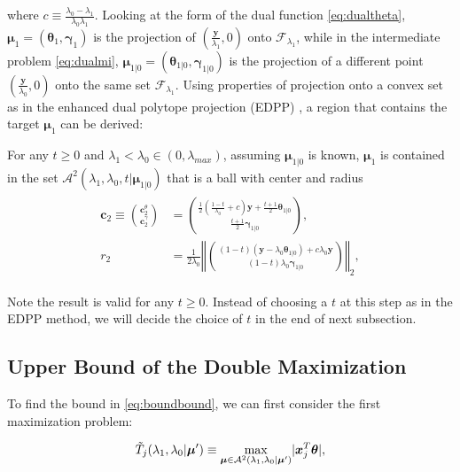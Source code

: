 where $c\equiv\frac{\lambda_0-\lambda_1}{\lambda_0\lambda_1}$. Looking at the form of the dual function \eqref{eq:dualtheta}, $\boldsymbol\mu_1=(\boldsymbol\theta_1,\boldsymbol\gamma_1)$ is the projection of $(\frac{\boldsymbol y}{\lambda_1},0)$ onto $\mathcal{F}_{\lambda_1}$, while in the intermediate problem \eqref{eq:dualmi}, $\boldsymbol\mu_{1|0}=(\boldsymbol\theta_{1|0},\boldsymbol\gamma_{1|0})$ is the projection of a different point $(\frac{\boldsymbol y}{\lambda_0},0)$ onto the same set $\mathcal{F}_{\lambda_1}$. Using properties of projection onto a convex set as in the enhanced dual polytope projection (EDPP) \citep{wang2013lasso}, a region that contains the target $\boldsymbol\mu_1$ can be derived:

\begin{theorem}
    \label{thm:1.2}
    For any $t\geq0$ and $\lambda_1<\lambda_{0}\in (0,\lambda_{max})$, assuming $\boldsymbol\mu_{1|0}$ is known, $\boldsymbol\mu_1$ is contained in the set $\mathcal{A}^2(\lambda_1,\lambda_0,t|\boldsymbol\mu_{1|0})$ that is a ball with center and radius
    \begin{gather}
        \begin{aligned}
            \boldsymbol c_2\equiv\binom{\boldsymbol c_2^\theta}{\boldsymbol c_2^\gamma}&=\binom{\frac{1}{2}(\frac{1-t}{\lambda_0}+c)\boldsymbol y+\frac{t+1}{2}\boldsymbol\theta_{1|0}}{\frac{t+1}{2}\boldsymbol\gamma_{1|0}},\\
            r_2&=\frac{1}{2\lambda_0}\left\Vert\binom{(1-t)(\boldsymbol y-\lambda_0\boldsymbol\theta_{1|0})+c\lambda_0\boldsymbol y}{(1-t)\lambda_0\boldsymbol\gamma_{1|0}}\right\Vert_2,
        \end{aligned}
    \end{gather}
\end{theorem}

Note the result is valid for any $t\geq 0$. Instead of choosing a $t$ at this step as in the EDPP method, we will decide the choice of $t$ in the end of next subsection.

\subsection{Upper Bound of the Double Maximization}


To find the bound in \eqref{eq:boundbound}, we can first consider the first maximization problem:

\begin{equation}
    \Tilde{T}_j(\lambda_1,\lambda_0|\boldsymbol\mu')\equiv\underset{\boldsymbol\mu\in\mathcal{A}^2(\lambda_1,\lambda_0|\boldsymbol\mu')}{\mathrm{max}}|\boldsymbol x_j^T\boldsymbol\theta|,
\end{equation}

